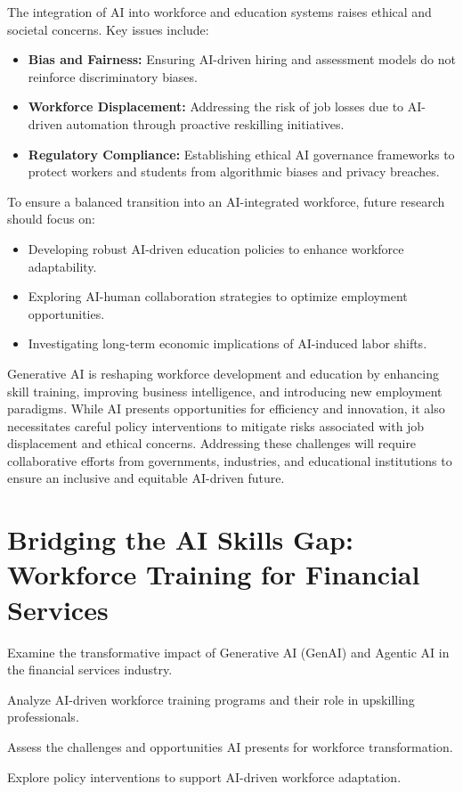 \documentclass[a4paper,headinclude=on,footinclude=on,12pt,oneside]{scrbook}
\begin{document}

The integration of AI into workforce and education systems raises ethical and societal concerns. Key issues include:
\begin{itemize}
	\item \textbf{Bias and Fairness:} Ensuring AI-driven hiring and assessment models do not reinforce discriminatory biases.
	\item \textbf{Workforce Displacement:} Addressing the risk of job losses due to AI-driven automation through proactive reskilling initiatives.
	\item \textbf{Regulatory Compliance:} Establishing ethical AI governance frameworks to protect workers and students from algorithmic biases and privacy breaches.
\end{itemize}


To ensure a balanced transition into an AI-integrated workforce, future research should focus on:
\begin{itemize}
	\item Developing robust AI-driven education policies to enhance workforce adaptability.
	\item Exploring AI-human collaboration strategies to optimize employment opportunities.
	\item Investigating long-term economic implications of AI-induced labor shifts.
\end{itemize}


Generative AI is reshaping workforce development and education by enhancing skill training, improving business intelligence, and introducing new employment paradigms. While AI presents opportunities for efficiency and innovation, it also necessitates careful policy interventions to mitigate risks associated with job displacement and ethical concerns. Addressing these challenges will require collaborative efforts from governments, industries, and educational institutions to ensure an inclusive and equitable AI-driven future.



\chapter{Bridging the AI Skills Gap: Workforce Training for Financial Services}

\begin{arrows}
	\item Examine the transformative impact of Generative AI (GenAI) and Agentic AI in the financial services industry.
	\item Analyze AI-driven workforce training programs and their role in upskilling professionals.
	\item Assess the challenges and opportunities AI presents for workforce transformation.
	\item Explore policy interventions to support AI-driven workforce adaptation.
\end{arrows}
\end{document}
